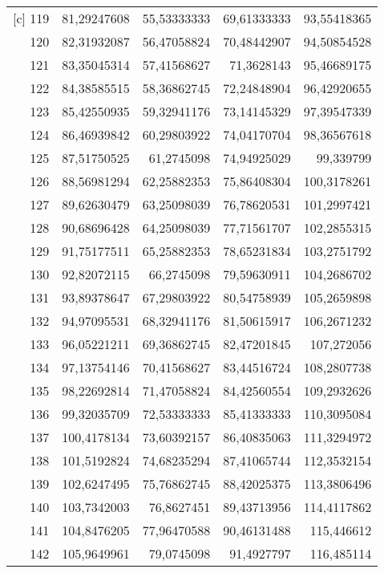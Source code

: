 \begin{longtable}{r|rrrr}[c]
    119   & 81,29247608 & 55,53333333 & 69,61333333 & 93,55418365 \\
    120   & 82,31932087 & 56,47058824 & 70,48442907 & 94,50854528 \\
    121   & 83,35045314 & 57,41568627 & 71,3628143 & 95,46689175 \\
    122   & 84,38585515 & 58,36862745 & 72,24848904 & 96,42920655 \\
    123   & 85,42550935 & 59,32941176 & 73,14145329 & 97,39547339 \\
    124   & 86,46939842 & 60,29803922 & 74,04170704 & 98,36567618 \\
    125   & 87,51750525 & 61,2745098 & 74,94925029 & 99,339799 \\
    126   & 88,56981294 & 62,25882353 & 75,86408304 & 100,3178261 \\
    127   & 89,62630479 & 63,25098039 & 76,78620531 & 101,2997421 \\
    128   & 90,68696428 & 64,25098039 & 77,71561707 & 102,2855315 \\
    129   & 91,75177511 & 65,25882353 & 78,65231834 & 103,2751792 \\
    130   & 92,82072115 & 66,2745098 & 79,59630911 & 104,2686702 \\
    131   & 93,89378647 & 67,29803922 & 80,54758939 & 105,2659898 \\
    132   & 94,97095531 & 68,32941176 & 81,50615917 & 106,2671232 \\
    133   & 96,05221211 & 69,36862745 & 82,47201845 & 107,272056 \\
    134   & 97,13754146 & 70,41568627 & 83,44516724 & 108,2807738 \\
    135   & 98,22692814 & 71,47058824 & 84,42560554 & 109,2932626 \\
    136   & 99,32035709 & 72,53333333 & 85,41333333 & 110,3095084 \\
    137   & 100,4178134 & 73,60392157 & 86,40835063 & 111,3294972 \\
    138   & 101,5192824 & 74,68235294 & 87,41065744 & 112,3532154 \\
    139   & 102,6247495 & 75,76862745 & 88,42025375 & 113,3806496 \\
    140   & 103,7342003 & 76,8627451 & 89,43713956 & 114,4117862 \\
    141   & 104,8476205 & 77,96470588 & 90,46131488 & 115,446612 \\
    142   & 105,9649961 & 79,0745098 & 91,4927797 & 116,485114 \\

\end{longtable}
